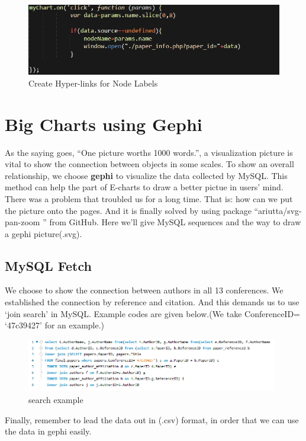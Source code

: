 \documentclass{book}
\begin{document}
\begin{figure}[htp]
\centering
\includegraphics[scale=0.55]{img/zlt_rel_code_label.png}
\caption{Create Hyper-links for Node Labels}
\end{figure}


\section{Big Charts using Gephi}

As the saying goes, ``One picture worths 1000 words.'', a visualization picture is vital to show the connection between objects in some scales. To show an overall relationship, we choose  \textbf{gephi} to visualize the data collected by MySQL. This method can help the part of E-charts to draw a better pictue in users' mind. 
There was a problem that troubled us for a long time. That is: how can we put the picture onto the pages. And it is finally solved by using package ``ariutta/svg-pan-zoom
'' from GitHub. 
Here we'll give MySQL sequences and the way to draw a gephi picture(.svg).

\subsection{MySQL Fetch}

We choose to show the connection between authors in all 13 conferences. We established the connection by reference and citation. And this demands us to use `join search' in MySQL. Example codes are given below.(We take ConferenceID= `47c39427' for an example.)

\begin{figure}[H]
\centering
\includegraphics[width=11cm]{img/yhb_my_1.png}
\caption{search example}
\end{figure}

Finally, remember to lead the data out in (.csv) format, in order that we can use the data in gephi easily.
\end{document}

